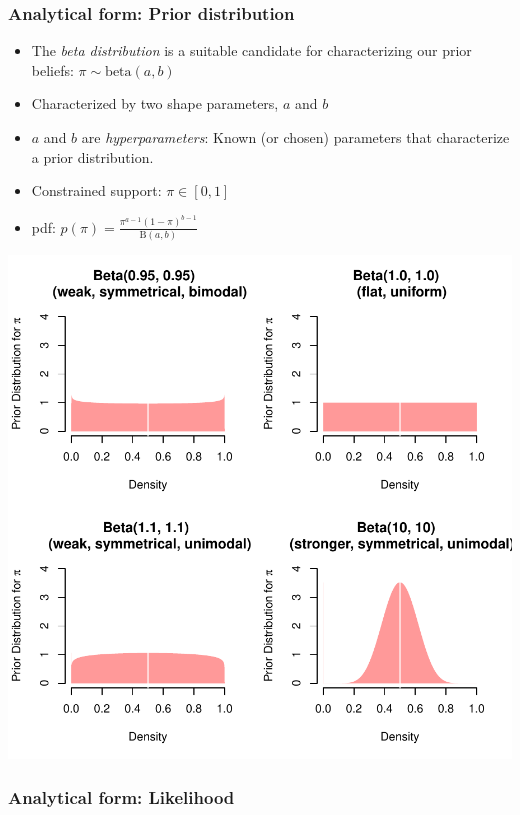 \documentclass[
  11pt,
]{article}
\providecommand{\tightlist}{%
  \setlength{\itemsep}{0pt}\setlength{\parskip}{0pt}}
\begin{document}
\hypertarget{analytical-form-prior-distribution}{%
\subsubsection{Analytical form: Prior distribution}\label{analytical-form-prior-distribution}}

\begin{itemize}
\tightlist
\item
  The \emph{beta distribution} is a suitable candidate for characterizing
  our prior beliefs: \(\pi \sim \text{beta}(a,b)\)
\item
  Characterized by two shape parameters, \(a\) and \(b\)
\item
  \(a\) and \(b\) are \emph{hyperparameters}: Known (or chosen) parameters that
  characterize a prior distribution.
\item
  Constrained support: \(\pi \in [0, 1]\)
\item
  pdf: \(p(\pi) = \frac{\pi^{a-1} (1- \pi)^{b-1}}{\text{B}(a, b)}\)
\end{itemize}

\begin{center}\includegraphics{01-02-lec_files/figure-latex/beta-1} \end{center}

\hypertarget{analytical-form-likelihood}{%
\subsubsection{Analytical form: Likelihood}\label{analytical-form-likelihood}}
\end{document}
